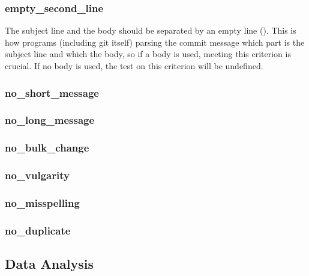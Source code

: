 \subsubsection{empty_second_line}
\label{subs:empty_second_line}
The subject line and the body should be separated by an empty line (\cite{TP}). This is how programs (including git itself) parsing the commit message which part is the subject line and which the body, so if a body is used, meeting this criterion is crucial. If no body is used, the test on this criterion will be undefined.

\subsubsection{no_short_message}
\label{subs:no_short_message}

\subsubsection{no_long_message}
\label{subs:no_long_message}

\subsubsection{no_bulk_change}
\label{subs:no_bulk_change}

\subsubsection{no_vulgarity}
\label{subs:no_vulgarity}

\subsubsection{no_misspelling}
\label{subs:no_misspelling}

\subsubsection{no_duplicate}
\label{subs:no_duplicate}


\subsection{Data Analysis}
\label{sub:analysis}

